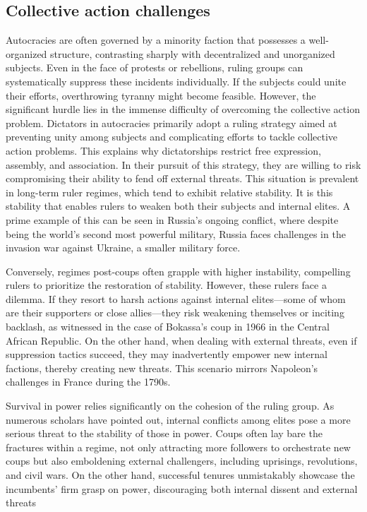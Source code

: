 \documentclass[
  12pt,
  a4paper,
  12pt]{article}
\begin{document}
\hypertarget{collective-action-challenges}{%
\subsection{Collective action
challenges}\label{collective-action-challenges}}

Autocracies are often governed by a minority faction that possesses a
well-organized structure, contrasting sharply with decentralized and
unorganized subjects. Even in the face of protests or rebellions, ruling
groups can systematically suppress these incidents individually. If the
subjects could unite their efforts, overthrowing tyranny might become
feasible. However, the significant hurdle lies in the immense difficulty
of overcoming the collective action problem. Dictators in autocracies
primarily adopt a ruling strategy aimed at preventing unity among
subjects and complicating efforts to tackle collective action problems.
This explains why dictatorships restrict free expression, assembly, and
association. In their pursuit of this strategy, they are willing to risk
compromising their ability to fend off external threats. This situation
is prevalent in long-term ruler regimes, which tend to exhibit relative
stability. It is this stability that enables rulers to weaken both their
subjects and internal elites. A prime example of this can be seen in
Russia's ongoing conflict, where despite being the world's second most
powerful military, Russia faces challenges in the invasion war against
Ukraine, a smaller military force.

Conversely, regimes post-coups often grapple with higher instability,
compelling rulers to prioritize the restoration of stability. However,
these rulers face a dilemma. If they resort to harsh actions against
internal elites---some of whom are their supporters or close
allies---they risk weakening themselves or inciting backlash, as
witnessed in the case of Bokassa's coup in 1966 in the Central African
Republic. On the other hand, when dealing with external threats, even if
suppression tactics succeed, they may inadvertently empower new internal
factions, thereby creating new threats. This scenario mirrors Napoleon's
challenges in France during the 1790s.

Survival in power relies significantly on the cohesion of the ruling
group. As numerous scholars have pointed out, internal conflicts among
elites pose a more serious threat to the stability of those in power.
Coups often lay bare the fractures within a regime, not only attracting
more followers to orchestrate new coups but also emboldening external
challengers, including uprisings, revolutions, and civil wars. On the
other hand, successful tenures unmistakably showcase the incumbents'
firm grasp on power, discouraging both internal dissent and external
threats
\end{document}
